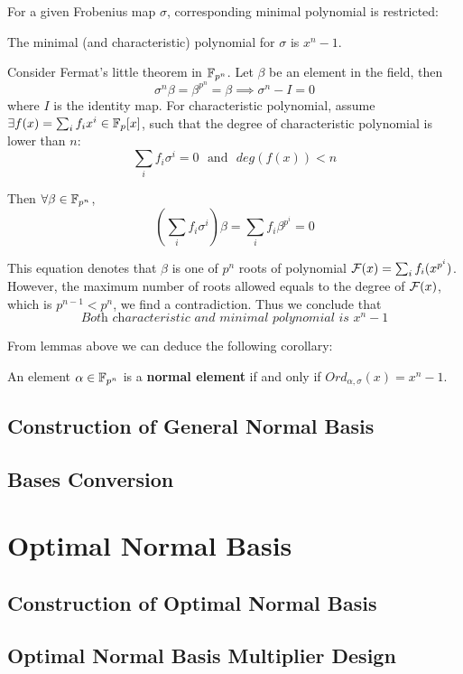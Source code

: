 For a given Frobenius map $\sigma$, corresponding minimal polynomial is restricted:
\begin{Lemma}
The minimal (and characteristic) polynomial for $\sigma$ is $x^n-1$.
\end{Lemma}
\begin{Proof}
Consider Fermat's little theorem in ${\mathbb{F}}_{p^n}$. Let $\beta$ be an element in the field, then
$$\sigma^n\beta = \beta^{p^n} = \beta \implies \sigma^n-I = 0$$
where $I$ is the identity map. For characteristic polynomial, assume $\exists f(x) = \sum_i f_ix^i \in {\mathbb{F}}_p[x]$, 
such that the degree of characteristic polynomial is lower than $n$:
$$\sum_if_i\sigma^i = 0~~~\text{and}~~~deg(f(x))<n$$

Then $\forall \beta\in{\mathbb{F}}_{p^n}$, 
$$\left(\sum_if_i\sigma^i\right)\beta = \sum_if_i\beta^{p^i} = 0$$

This equation denotes that $\beta$ is one of $p^n$ roots of polynomial ${\mathcal{F}}(x) = \sum_if_i(x^{p^i})$.
However, the maximum number of roots allowed equals to the degree of ${\mathcal{F}}(x)$, which is 
$p^{n-1}<p^n$, we find a contradiction. Thus we conclude that
$$\textit{Both characteristic and minimal polynomial is }x^n-1$$
\end{Proof}

From lemmas above we can deduce the following corollary:
\begin{Corollary}
An element $\alpha \in {\mathbb{F}}_{p^n}$ is a {\bf normal element} if and only if $Ord_{\alpha,\sigma}(x) = x^n-1$.
\end{Corollary}
\subsection{Construction of General Normal Basis}
\subsection{Bases Conversion}

\section{Optimal Normal Basis}
\label{append:ONB}
\subsection{Construction of Optimal Normal Basis}
\subsection{Optimal Normal Basis Multiplier Design}
